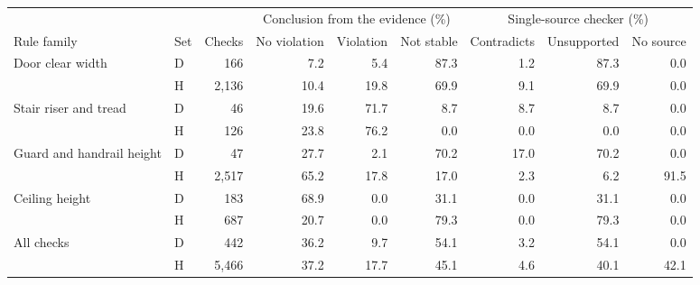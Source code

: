 \begin{tabular}{@{}llrrrrrrr@{}}
\toprule
 & & & \multicolumn{3}{c}{Conclusion from the evidence (\%)} & \multicolumn{3}{c}{Single-source checker (\%)} \\
\cmidrule(lr){4-6}\cmidrule(l){7-9}
Rule family & Set & Checks & No violation & Violation & Not stable & Contradicts & Unsupported & No source \\
\midrule
Door clear width & D & 166 & 7.2 & 5.4 & 87.3 & 1.2 & 87.3 & 0.0 \\
 & H & 2,136 & 10.4 & 19.8 & 69.9 & 9.1 & 69.9 & 0.0 \\
\addlinespace
Stair riser and tread & D & 46 & 19.6 & 71.7 & 8.7 & 8.7 & 8.7 & 0.0 \\
 & H & 126 & 23.8 & 76.2 & 0.0 & 0.0 & 0.0 & 0.0 \\
\addlinespace
Guard and handrail height & D & 47 & 27.7 & 2.1 & 70.2 & 17.0 & 70.2 & 0.0 \\
 & H & 2,517 & 65.2 & 17.8 & 17.0 & 2.3 & 6.2 & 91.5 \\
\addlinespace
Ceiling height & D & 183 & 68.9 & 0.0 & 31.1 & 0.0 & 31.1 & 0.0 \\
 & H & 687 & 20.7 & 0.0 & 79.3 & 0.0 & 79.3 & 0.0 \\
\addlinespace
All checks & D & 442 & 36.2 & 9.7 & 54.1 & 3.2 & 54.1 & 0.0 \\
 & H & 5,466 & 37.2 & 17.7 & 45.1 & 4.6 & 40.1 & 42.1 \\
\bottomrule
\end{tabular}
